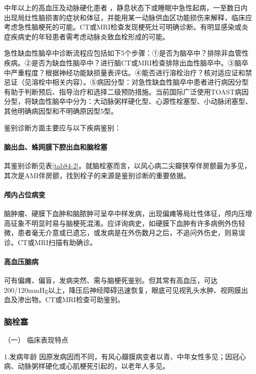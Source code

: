 中年以上的高血压及动脉硬化患者
，静息状态下或睡眠中急性起病，一至数日内出现局灶性脑损害的症状和体征，并能用某一动脉供血区功能损伤来解释，临床应考虑急性脑梗死的可能。CT或MRI检查发现梗死灶可明确诊断。有明显感染或炎症疾病史的年轻患者需考虑动脉炎致血栓形成的可能。

急性缺血性脑卒中诊断流程应包括如下5个步骤：①是否为脑卒中？排除非血管性疾病。②是否为缺血性脑卒中？进行脑CT或MRI检查排除出血性脑卒中。③脑卒中严重程度？根据神经功能缺损量表评估。④能否进行溶栓治疗？核对适应证和禁忌证（见溶栓中相关内容）。⑤病因分型：对急性缺血性脑卒中患者进行病因分型有助于判断预后、指导治疗和选择二级预防措施。当前国际广泛使用TOAST病因分型，将缺血性脑卒中分为：大动脉粥样硬化型、心源性栓塞型、小动脉闭塞型、其他明确病因型和不明确原因型5型。

鉴别诊断方面主要应与以下疾病鉴别：

\paragraph{脑出血、蛛网膜下腔出血和脑栓塞}

其鉴别诊断见表\ref{tab84-2}。就脑栓塞而言，以风心病二尖瓣狭窄伴房颤最为多见，其次是AMI伴房颤，找到栓子的来源是鉴别诊断的重要依据。

\paragraph{颅内占位病变}

脑肿瘤、硬膜下血肿和脑脓肿可呈卒中样发病，出现偏瘫等局灶性体征，颅内压增高征象不明显时易与脑梗死混淆。应详询病史，如硬膜下血肿有许多病例外伤轻微，患者毫无介意或已遗忘，或发病是在外伤数月之后，不追问外伤史，则易误诊。CT或MRI扫描有助确诊。

\paragraph{高血压脑病}

可有偏瘫、偏盲，发病突然、需与脑梗死鉴别。但其常有高血压，可达200/120mmHg以上，降压后神经障碍迅速恢复，眼底可见视乳头水肿、视网膜出血及渗出物。CT或MRI检查可助鉴别。

\subsubsection{脑栓塞}

\hypertarget{text00242.htmlux5cux23CHP8-1-2-2-2-1}{}
（一） 临床表现特点

1.发病年龄
因原发病因而不同，有风心瓣膜病变者以青、中年女性多见；因冠心病、动脉粥样硬化或心肌梗死引起的，以老年人多见。

